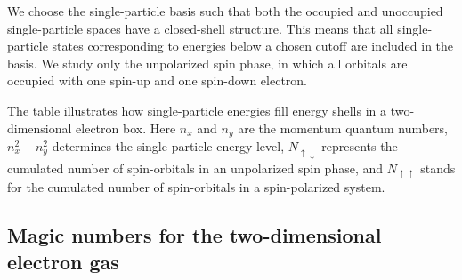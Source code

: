 \documentclass[%
oneside,                 %
final,                   %
10pt]{article}
\begin{document}
We choose  the single-particle basis such that both the occupied and 
unoccupied single-particle spaces have a closed-shell 
structure. This means that all single-particle states 
corresponding to energies below a chosen cutoff are
included in the basis. We study only the unpolarized spin
phase, in which all orbitals are occupied with one spin-up 
and one spin-down electron. 


The table illustrates  how single-particle energies
    fill energy shells in a two-dimensional electron box.
  Here $n_{x}$ and $n_{y}$ are the momentum quantum numbers,
  $n_{x}^{2} + n_{y}^{2}$ determines the single-particle 
  energy level, $N_{\uparrow \downarrow }$ represents the 
  cumulated number of spin-orbitals in an unpolarized spin
  phase, and $N_{\uparrow \uparrow }$ stands for the
  cumulated number of spin-orbitals in a spin-polarized
  system.




\subsection{Magic numbers for the two-dimensional electron gas}
\end{document}
